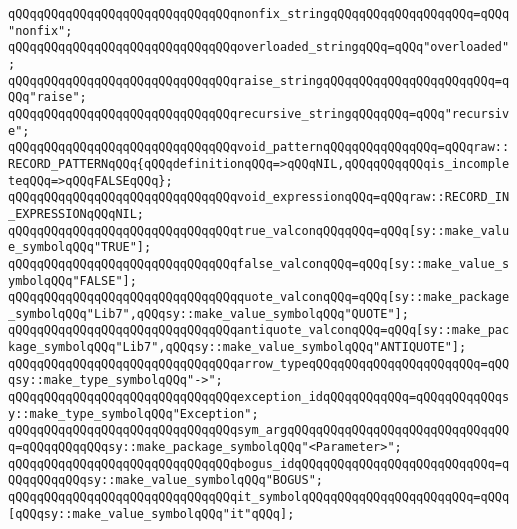 \verb|qQQqqQQqqQQqqQQqqQQqqQQqqQQqqQQqnonfix_stringqQQqqQQqqQQqqQQqqQQq=qQQq"nonfix";|\newline
\verb|qQQqqQQqqQQqqQQqqQQqqQQqqQQqqQQqoverloaded_stringqQQq=qQQq"overloaded";|\newline
\verb|qQQqqQQqqQQqqQQqqQQqqQQqqQQqqQQqraise_stringqQQqqQQqqQQqqQQqqQQqqQQq=qQQq"raise";|\newline
\verb|qQQqqQQqqQQqqQQqqQQqqQQqqQQqqQQqrecursive_stringqQQqqQQq=qQQq"recursive";|\newline
\newline
\verb|qQQqqQQqqQQqqQQqqQQqqQQqqQQqqQQqvoid_patternqQQqqQQqqQQqqQQq=qQQqraw::RECORD_PATTERNqQQq{qQQqdefinitionqQQq=>qQQqNIL,qQQqqQQqqQQqis_incompleteqQQq=>qQQqFALSEqQQq};|\newline
\verb|qQQqqQQqqQQqqQQqqQQqqQQqqQQqqQQqvoid_expressionqQQq=qQQqraw::RECORD_IN_EXPRESSIONqQQqNIL;|\newline
\newline
\verb|qQQqqQQqqQQqqQQqqQQqqQQqqQQqqQQqtrue_valconqQQqqQQq=qQQq[sy::make_value_symbolqQQq"TRUE"];|\newline
\verb|qQQqqQQqqQQqqQQqqQQqqQQqqQQqqQQqfalse_valconqQQq=qQQq[sy::make_value_symbolqQQq"FALSE"];|\newline
\verb|qQQqqQQqqQQqqQQqqQQqqQQqqQQqqQQqquote_valconqQQq=qQQq[sy::make_package_symbolqQQq"Lib7",qQQqsy::make_value_symbolqQQq"QUOTE"];|\newline
\newline
\verb|qQQqqQQqqQQqqQQqqQQqqQQqqQQqqQQqantiquote_valconqQQq=qQQq[sy::make_package_symbolqQQq"Lib7",qQQqsy::make_value_symbolqQQq"ANTIQUOTE"];|\newline
\verb|qQQqqQQqqQQqqQQqqQQqqQQqqQQqqQQqarrow_typeqQQqqQQqqQQqqQQqqQQqqQQq=qQQqsy::make_type_symbolqQQq"->";|\newline
\newline
\verb|qQQqqQQqqQQqqQQqqQQqqQQqqQQqqQQqexception_idqQQqqQQqqQQq=qQQqqQQqqQQqsy::make_type_symbolqQQq"Exception";|\newline
\verb|qQQqqQQqqQQqqQQqqQQqqQQqqQQqqQQqsym_argqQQqqQQqqQQqqQQqqQQqqQQqqQQqqQQq=qQQqqQQqqQQqsy::make_package_symbolqQQq"<Parameter>";|\newline
\verb|qQQqqQQqqQQqqQQqqQQqqQQqqQQqqQQqbogus_idqQQqqQQqqQQqqQQqqQQqqQQqqQQq=qQQqqQQqqQQqsy::make_value_symbolqQQq"BOGUS";|\newline
\verb|qQQqqQQqqQQqqQQqqQQqqQQqqQQqqQQqit_symbolqQQqqQQqqQQqqQQqqQQqqQQq=qQQq[qQQqsy::make_value_symbolqQQq"it"qQQq];|\newline
\newline
